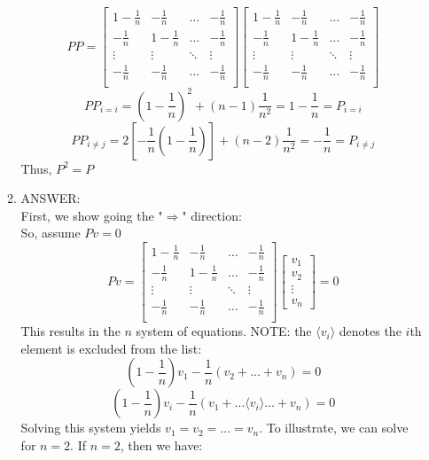 \documentclass[a4paper, 12pt]{article}
\begin{document}
\begin{enumerate}
\begin{enumerate}
	$$PP =  \left[ \begin{array}{cccc}  1-\frac{1}{n} & -\frac{1}{n} & \dots & -\frac{1}{n} \\
							   -\frac{1}{n} & 1-\frac{1}{n} & \dots & -\frac{1}{n} \\
							    \vdots           & \vdots           & \ddots & \vdots \\
							  -\frac{1}{n}  & -\frac{1}{n}  & \dots & -\frac{1}{n} \\	
								   \end{array}\right]     
\left[ \begin{array}{cccc}  1-\frac{1}{n} & -\frac{1}{n} & \dots & -\frac{1}{n} \\
							   -\frac{1}{n} & 1-\frac{1}{n} & \dots & -\frac{1}{n} \\
							    \vdots           & \vdots           & \ddots & \vdots \\
							  -\frac{1}{n}  & -\frac{1}{n}  & \dots & -\frac{1}{n} \\	
								   \end{array}\right]  $$
$$PP_{i = i} = (1-\frac{1}{n})^2 + (n-1)\frac{1}{n^2} = 1 - \frac{1}{n} = P_{i=i}$$
$$PP_{i \ne j} = 2[-\frac{1}{n} (1- \frac{1}{n})]  +  (n-2) \frac{1}{n^2} = -\frac{1}{n} = P_{i \ne j}$$
Thus, $P^2 = P$

	\item ANSWER: 
	\\
	First, we show going the "$\Rightarrow$" direction:
	\\ So, assume $Pv = 0$
	$$Pv =  \left[ \begin{array}{cccc}  1-\frac{1}{n} & -\frac{1}{n} & \dots & -\frac{1}{n} \\
							   -\frac{1}{n} & 1-\frac{1}{n} & \dots & -\frac{1}{n} \\
							    \vdots           & \vdots           & \ddots & \vdots \\
							  -\frac{1}{n}  & -\frac{1}{n}  & \dots & -\frac{1}{n} \\	
								   \end{array}\right]  
		\left[ \begin{array}{c} v_1 \\ v_2 \\ \vdots \\ v_n \end{array}\right] = 0
		$$
	This results in the $n$ system of equations. NOTE: the $\langle v_i \rangle$ denotes the $i$th element is excluded from the list:
	\begin{equation}  \tag{eq. 1}
	(1-\frac{1}{n})v_1 - \frac{1}{n}(v_2 + ... + v_n) = 0 
	\end{equation}
	\begin{equation}  \tag{eq. i}
	(1-\frac{1}{n})v_i - \frac{1}{n}(v_1 + ...\langle v_i \rangle... + v_n) = 0 
	\end{equation}
	Solving this system yields $v_1 = v_2 = ... = v_n$. To illustrate, we can solve for $n=2$. If $n=2$, then we have:


\end{enumerate}
\end{enumerate}
\end{document}
